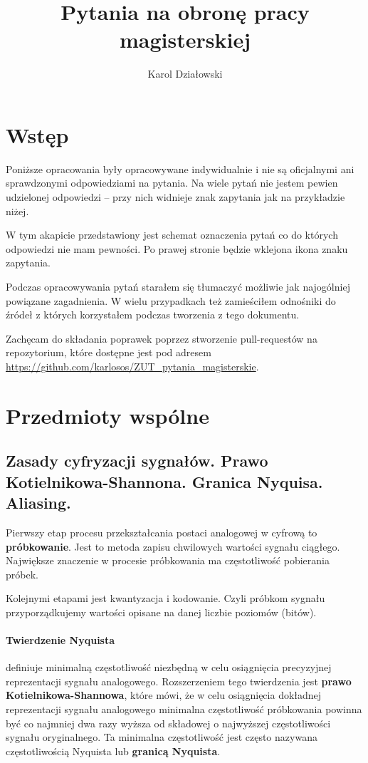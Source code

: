 \documentclass[wi]{zut}
\author{Karol Działowski}
\title{Pytania na obronę pracy magisterskiej}
\begin{document}
\maketitle
\tableofcontents

\section{Wstęp}

Poniższe opracowania były opracowywane indywidualnie i nie są oficjalnymi ani sprawdzonymi odpowiedziami na pytania. Na wiele pytań nie jestem pewien udzielonej odpowiedzi -- przy nich widnieje znak zapytania jak na przykładzie niżej.

W tym akapicie przedstawiony jest schemat oznaczenia pytań co do których odpowiedzi nie mam pewności. Po prawej stronie będzie wklejona ikona znaku zapytania.
\question

Podczas opracowywania pytań starałem się tłumaczyć możliwie jak najogólniej powiązane zagadnienia. W wielu przypadkach też zamieściłem odnośniki do źródeł z których korzystałem podczas tworzenia z tego dokumentu.

Zachęcam do składania poprawek poprzez stworzenie pull-requestów na repozytorium, które dostępne jest pod adresem \url{https://github.com/karlosos/ZUT_pytania_magisterskie}.

\section{Przedmioty wspólne}

\subsection{Zasady cyfryzacji sygnałów. Prawo Kotielnikowa-Shannona. Granica Nyquisa. Aliasing.}

Pierwszy etap procesu przekształcania postaci analogowej w cyfrową to \textbf{próbkowanie}. Jest to metoda zapisu chwilowych wartości sygnału ciągłego. Największe znaczenie w procesie próbkowania ma częstotliwość pobierania próbek.

Kolejnymi etapami jest kwantyzacja i kodowanie. Czyli próbkom sygnału przyporządkujemy wartości opisane na danej liczbie poziomów (bitów).

\paragraph{Twierdzenie Nyquista} definiuje minimalną częstotliwość niezbędną w celu osiągnięcia precyzyjnej reprezentacji sygnału analogowego. Rozszerzeniem tego twierdzenia jest \textbf{prawo Kotielnikowa-Shannowa}, które mówi, że w celu osiągnięcia dokładnej reprezentacji sygnału analogowego minimalna częstotliwość próbkowania powinna być co najmniej dwa razy wyższa od składowej o najwyższej częstotliwości sygnału oryginalnego. Ta minimalna częstotliwość jest często nazywana częstotliwością Nyquista lub \textbf{granicą Nyquista}.
\end{document}
